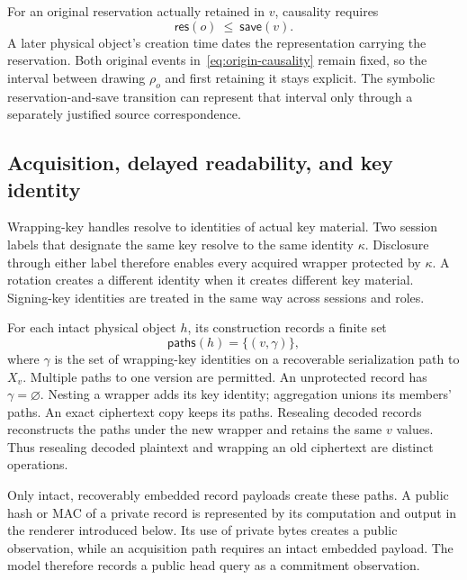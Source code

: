 \documentclass[pdflatex]{sn-jnl}
\theoremstyle{thmstyleone}
\theoremstyle{thmstylethree}
\theoremstyle{thmstyletwo}
\begin{document}
For an original reservation actually retained in $v$, causality requires
\begin{equation}
  \mathsf{res}(o)\ \leq\ \mathsf{save}(v).
  \label{eq:origin-causality}
\end{equation}
A later physical object's creation time dates the representation carrying
the reservation. Both original events in~\eqref{eq:origin-causality} remain
fixed, so the interval between drawing $\rho_o$ and first retaining it stays
explicit. The symbolic reservation-and-save transition can represent that
interval only through a separately justified source correspondence.

\subsection{Acquisition, delayed readability, and key identity}

Wrapping-key handles resolve to identities of actual key material.  Two
session labels that designate the same key resolve to the same identity
$\kappa$.  Disclosure through either label therefore enables every acquired
wrapper protected by $\kappa$.  A rotation creates a different identity when
it creates different key material.  Signing-key identities are treated in
the same way across sessions and roles.

For each intact physical object $h$, its construction records a finite set
\[
  \mathsf{paths}(h)=\{(v,\gamma)\},
\]
where $\gamma$ is the set of wrapping-key identities on a recoverable
serialization path to $X_v$.  Multiple paths to one version are permitted.
An unprotected record has $\gamma=\varnothing$.  Nesting a wrapper adds its
key identity; aggregation unions its members' paths.  An exact ciphertext
copy keeps its paths.  Resealing decoded records reconstructs the paths under
the new wrapper and retains the same $v$ values.  Thus resealing decoded
plaintext and wrapping an old ciphertext are distinct operations.

Only intact, recoverably embedded record payloads create these paths.  A
public hash or MAC of a private record is represented by its computation and
output in the renderer introduced below. Its use of private bytes creates a
public observation, while an acquisition path requires an intact embedded
payload. The model therefore records a public head query as a commitment
observation.
\end{document}
